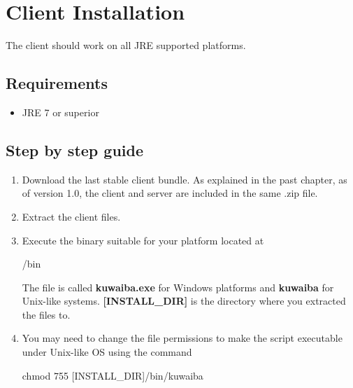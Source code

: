 \documentclass[a4paper]{article}
\begin{document}
			\section{Client Installation}
				The client should work on all JRE supported platforms.
				\subsection{Requirements}
					\begin{itemize}
						\item JRE 7 or superior
					\end{itemize}
			
				\subsection{Step by step guide}
					\begin{enumerate}
						\item Download the last stable client bundle. As explained in the past chapter, as of version 1.0, the client and server are included in the same .zip file.
						\item Extract the client files.
						\item Execute the binary suitable for your platform located at
						\begin{verbbox}
							/bin
						\end{verbbox}
						\begin{figure}[ht]
							\centering	
							\theverbbox
						\end{figure}
						The file is called \textbf{kuwaiba.exe} for Windows platforms and \textbf{kuwaiba} for Unix-like systems. \textbf{[INSTALL\_DIR]} is the directory where you extracted the files to.
						\item You may need to change the file permissions to make the script executable under Unix-like OS using the command
						\begin{verbbox}
							chmod 755 [INSTALL_DIR]/bin/kuwaiba
						\end{verbbox}
						\begin{figure}[ht]
							\centering	
							\theverbbox
						\end{figure}	
						
					\end{enumerate}
\end{document}
